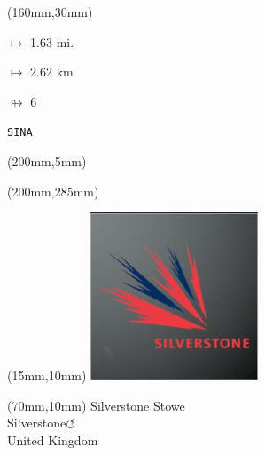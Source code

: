 \begin{textblock*}{40mm}(160mm,30mm)%
\Large
\par$\mapsto$ 1.63 mi.
\par$\mapsto$ 2.62 km
\par$\looparrowright$ 6
\par\hfill\tiny\tt SINA\\
\end{textblock*}
\begin{textblock*}{20mm}(200mm,5mm)%
\fbox{\thepage}
\label{SINA}
\end{textblock*}
\begin{textblock*}{20mm}(200mm,285mm)%
\fbox{\thepage}
\end{textblock*}

\null\newpage
\begin{textblock*}{50mm}(15mm,10mm)%
\includegraphics[width=50mm]{LG/2015-05-20_00094.png}
\end{textblock*}
\begin{textblock*}{130mm}(70mm,10mm)%
{\fontsize{20}{20}\selectfont Silverstone Stowe\\}
{\fontsize{16}{16}\selectfont Silverstone\hfill \Large$\circlearrowleft$\\}
{\fontsize{12}{12}\selectfont United Kingdom\\}
\end{textblock*}
